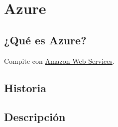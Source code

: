 \chapter{Azure}
\hypertarget{azure}{}
\section{¿Qué es Azure?}


Compite con \hyperlink{AWS}{Amazon Web Services}.

\section{Historia}

\section{Descripción}
